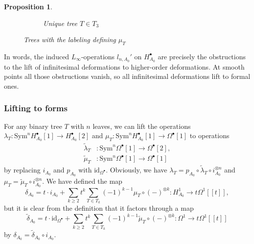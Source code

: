 \documentclass[11pt,a4paper]{amsart}
\theoremstyle{plain} %
\newtheorem{prop}[thm]{Proposition}
\theoremstyle{definition}
\theoremstyle{remark}
\newcommand{\mr}{\mathrm}
\newcommand{\sfa}{\mathsf{a}}
\newcommand{\sfb}{\mathsf{b}}
\newcommand{\sfc}{\mathsf{c}}
\newcommand{\til}{\widetilde}
\begin{document}
\begin{prop}
\begin{figure}
\begin{subfigure}{0.6\textwidth}
\begin{tikzpicture}
    \end{tikzpicture}
    \caption{Unique tree $T \in T_3$}
    \end{subfigure}
    \caption{Trees with the labeling defining $\mu_T$}
    \label{fig: mu}
\end{figure}
\end{prop}
In words, the induced $L_\infty$-operations $l_{n,A_0}'$ on $H^\bullet_{A_0}$ are precisely the obstructions to the lift of infinitesimal deformations to higher-order deformations. At smooth points all those obstructions vanish, so all infinitesimal deformations lift to  formal ones. 
\subsubsection{Lifting to forms}
For any binary tree $T$  with $n$ leaves, we can lift the operations $\lambda_T\colon \mr{Sym}^n H^\bullet_{A_0}[1] \to H^\bullet_{A_0}[2]$ and $\mu_T\colon \mr{Sym}^n H^\bullet_{A_0}[1]  \to \Omega^\bullet[1]$ to operations \begin{align}
    \til{\lambda}_T&\colon \mr{Sym}^n \Omega^\bullet[1] \to \Omega^\bullet[2], \\
    \til{\mu}_T&\colon \mr{Sym}^n \Omega^\bullet[1] \to \Omega^\bullet[1] \label{eq: def mu tilde}
\end{align}
by replacing $i_{A_0}$ and $p_{A_0}$ with $\mr{id}_{\Omega^\bullet}$. Obviously, we have $\lambda_T = p_{A_0} \circ \til{\lambda}_T \circ i_{A_0}^{\otimes n}$ and $\mu_T = \til{\mu}_T \circ i_{A_0}^{\otimes n}$. 
    We have defined the map
    $$\delta_{A_0} = t\cdot i_{A_0} +  \sum_{k \geq 2} t^k \sum_{T \in T_k} (-1)^{k-1} \mu_T
     \circ (-)^{\otimes k}\colon H^1_{A_0} \to t\Omega^1[[t]],$$
    but it is clear from the definition that it factors through a map 
    \begin{equation} 
    \til{\delta}_{A_0} = t\cdot\mr{id}_{\Omega^\bullet} +  \sum_{k \geq 2} t^k \sum_{T \in T_k} (-1)^{k-1} \til{\mu}_T \circ (-)^{\otimes k}  \colon \Omega^1 \to t \Omega^1[[t]]\label{eq: def tilde delta}
    \end{equation} 
    by $\delta_{A_0} = \til{\delta}_{A_0} \circ i_{A_0}.$   
    
\end{document}
